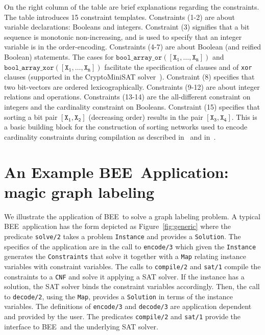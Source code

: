 \documentclass{tlp}
\newcommand{\bee}{\textsf{BEE}}
\begin{document}
On the right column of the table are brief explanations regarding the
constraints. The table introduces 15 constraint templates.
Constraints (1-2) are about variable declarations: Booleans and
integers. Constraint (3) signifies that a bit sequence is monotonic
non-increasing, and is used to specify that an integer variable is in
the order-encoding.
Constraints (4-7) are about Boolean (and reified Boolean)
statements. The cases for $\mathtt{bool\_array\_or([X_1,\ldots,X_n])}$
and $\mathtt{bool\_array\_xor([X_1,\ldots,X_n])}$ facilitate the
specification of clauses and of \texttt{xor} clauses (supported in the
CryptoMiniSAT solver~\cite{Crypto}).
Constraint (8) specifies that two bit-vectors are ordered
lexicographically. 
Constraints (9-12) are about integer relations and operations.
Constraints (13-14) are the all-different constraint on integers and
the cardinality constraint on Booleans.  Constraint (15) specifies
that sorting a bit pair $\mathtt{[X_1,X_2]}$ (decreasing order)
results in the pair $\mathtt{[X_3,X_4]}$. This is a basic building
block for the construction of sorting networks \cite{Batcher68} used
to encode cardinality constraints during compilation as described
in~\cite{AsinNOR11} and in~\cite{DBLP:conf/lpar/CodishZ10}.




\section{An Example \bee\ Application: magic graph labeling}
\label{sec:magic}

We illustrate the application of \bee\ to solve a
graph labeling problem.
A typical \bee\ application has the form depicted as
Figure~\ref{fig:generic} where the predicate \texttt{solve/2} takes a
problem \texttt{Instance} and provides a \texttt{Solution}. The
specifics of the application are in the call to \texttt{encode/3}
which given the \texttt{Instance} generates the \texttt{Constraints}
that solve it together with a \texttt{Map} relating instance variables with
constraint variables.  The calls to \texttt{compile/2} and 
\texttt{sat/1} compile the constraints to a \texttt{CNF} and solve it
applying a SAT solver. If the instance has a solution, the SAT solver
binds the constraint variables accordingly. Then, the call to
\texttt{decode/2}, using the \texttt{Map}, provides a
\texttt{Solution} in terms of the instance variables.
The definitions of \texttt{encode/3} and \texttt{decode/3} are
application dependent and provided by the user. The predicates
\texttt{compile/2} and \texttt{sat/1} provide the interface to \bee\
and the underlying SAT solver.
\end{document}
